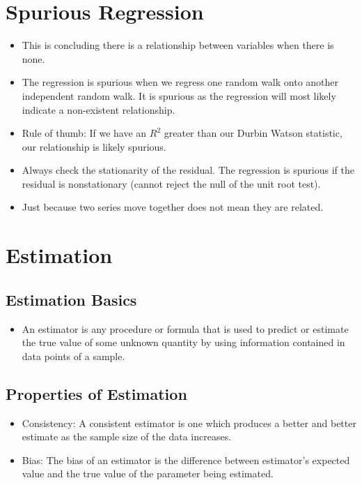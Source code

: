 \documentclass[11pt]{article}
\begin{document}
\section{Spurious Regression}
\begin{itemize}
    \item This is concluding there is a relationship between variables when there is none. 
    \item The regression is spurious when we regress one random walk onto another independent 
    random walk. It is spurious as the regression will most likely indicate a non-existent 
    relationship. 
    \item Rule of thumb: If we have an $R^2$ greater than our Durbin Watson statistic, our 
    relationship is likely spurious. 
    \item Always check the stationarity of the residual. The regression is spurious if the 
    residual is nonstationary (cannot reject the null of the unit root test).
    \item Just because two series move together does not mean they are related. 
\end{itemize}

\section{Estimation}
\subsection{Estimation Basics}
\begin{itemize}
    \item An estimator is any procedure or formula that is used to predict or estimate the
    true value of some unknown quantity by using information contained in data points of a 
    sample.
\end{itemize}

\subsection{Properties of Estimation}
\begin{itemize}
    \item Consistency: A consistent estimator is one which produces a better and better 
    estimate as the sample size of the data increases. 
    \item Bias: The bias of an estimator is the difference between estimator's expected value 
    and the true value of the parameter being estimated. 
\end{itemize}
\end{document}

